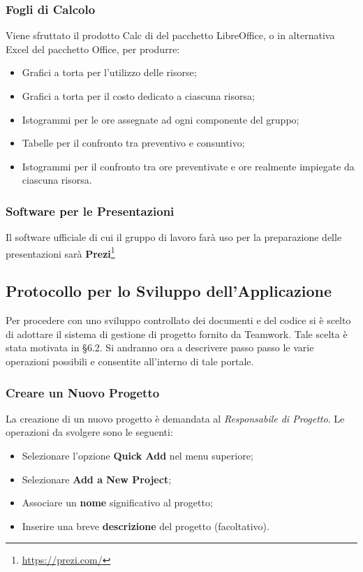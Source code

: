 \subsubsection{Fogli di Calcolo}
Viene sfruttato il prodotto Calc di del pacchetto LibreOffice, o in alternativa Excel del pacchetto Office, per produrre:
\begin{itemize}
\item Grafici a torta per l'utilizzo delle risorse;
\item Grafici a torta per il costo dedicato a ciascuna risorsa;
\item Istogrammi per le ore assegnate ad ogni componente del gruppo;
\item Tabelle per il confronto tra preventivo e consuntivo;
\item Istogrammi per il confronto tra ore preventivate e ore realmente impiegate da ciascuna risorsa.
\end{itemize}

\subsubsection{Software per le Presentazioni}
Il software ufficiale di cui il gruppo di lavoro farà uso per la preparazione delle presentazioni sarà \textbf{Prezi}\footnote[4]{\url{https://prezi.com/}}

\subsection{Protocollo per lo Sviluppo dell'Applicazione}

Per procedere con uno sviluppo controllato dei documenti e del codice si è scelto di adottare il sistema di gestione di progetto fornito da Teamwork. Tale scelta è stata motivata in §6.2. Si andranno ora a descrivere passo passo le varie operazioni possibili e consentite all'interno di tale portale.

\subsubsection{Creare un Nuovo Progetto}

La creazione di un nuovo progetto è demandata al \textit{Responsabile di Progetto}. Le operazioni da svolgere sono le seguenti:
\begin{itemize}
\item Selezionare l'opzione \textbf{Quick Add} nel menu superiore;
\item Selezionare \textbf{Add a New Project};
\item Associare un \textbf{nome} significativo al progetto;
\item Inserire una breve \textbf{descrizione} del progetto (facoltativo).
\end{itemize}

